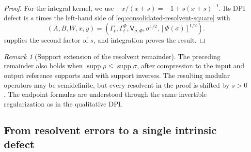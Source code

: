 \documentclass[11pt]{article}
\theoremstyle{remark}
\newtheorem{remark}[remark]{Remark}
\newcommand{\1}{\mathbbm{1}}
\begin{document}
\begin{proof}
For the integral kernel, we use
$-x/(x+s)=-1+s(x+s)^{-1}$.  Its DPI defect is $s$ times the
left-hand side of \eqref{eq:consolidated-resolvent-square} with
\begin{equation}
 (A,B,W,x,y)
 =(\Gamma_t,\Gamma_t^\Phi,\mathsf V_{\sigma,\Phi},
   \sigma^{1/2},[\Phi(\sigma)]^{1/2}).
\end{equation}
 supplies the second factor of
$s$, and integration proves the result.
\end{proof}

\begin{remark}[Support extension of the resolvent remainder]
The preceding remainder also holds when
$\operatorname{supp}\rho\leq\operatorname{supp}\sigma$, after
compression to the input and output reference supports and with
support inverses.  The resulting modular operators may be
semidefinite, but every resolvent in the proof is shifted by $s>0$.
The endpoint formulas are understood through the same invertible
regularization as in the qualitative DPI.
\end{remark}

\subsection{From resolvent errors to a single intrinsic defect}
\end{document}
